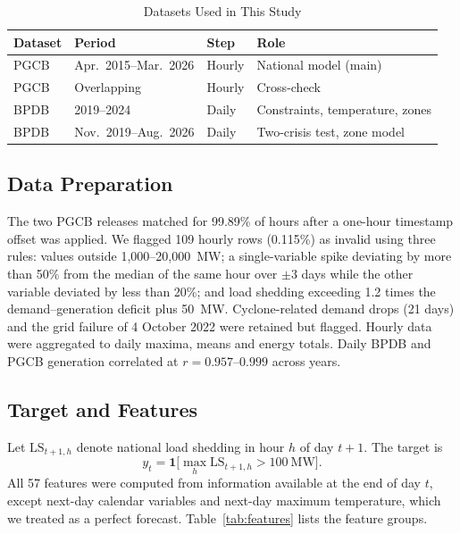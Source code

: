 \documentclass[conference]{IEEEtran}
\begin{document}
\begin{table}[!t]
\caption{Datasets Used in This Study}
\label{tab:data}
\centering
\footnotesize
\begin{tabular}{@{}L{1.3cm}L{2.2cm}L{0.95cm}L{2.45cm}@{}}
\toprule
Dataset & Period & Step & Role \\
\midrule
PGCB~\cite{shekh2026} & Apr.\ 2015--Mar.\ 2026 & Hourly & National model (main) \\
PGCB~\cite{ucipgcb} & Overlapping & Hourly & Cross-check \\
BPDB~\cite{hossain2025} & 2019--2024 & Daily & Constraints, temperature, zones \\
BPDB~\cite{islam2026} & Nov.\ 2019--Aug.\ 2026 & Daily & Two-crisis test, zone model \\
\bottomrule
\end{tabular}
\end{table}

\subsection{Data Preparation}
The two PGCB releases matched for 99.89\% of hours after a one-hour timestamp offset was applied. We flagged 109 hourly rows (0.115\%) as invalid using three rules: values outside 1,000--20,000~MW; a single-variable spike deviating by more than 50\% from the median of the same hour over $\pm 3$ days while the other variable deviated by less than 20\%; and load shedding exceeding 1.2 times the demand--generation deficit plus 50~MW. Cyclone-related demand drops (21 days) and the grid failure of 4 October 2022 were retained but flagged. Hourly data were aggregated to daily maxima, means and energy totals. Daily BPDB and PGCB generation correlated at $r = 0.957$--$0.999$ across years.

\subsection{Target and Features}
Let $\mathrm{LS}_{t+1,h}$ denote national load shedding in hour $h$ of day $t+1$. The target is
\begin{equation}
y_{t} = \mathbf{1}\Big[\max_{h} \mathrm{LS}_{t+1,h} > 100~\mathrm{MW}\Big]. \label{eq:target}
\end{equation}
All 57 features were computed from information available at the end of day $t$, except next-day calendar variables and next-day maximum temperature, which we treated as a perfect forecast. Table~\ref{tab:features} lists the feature groups.
\end{document}
